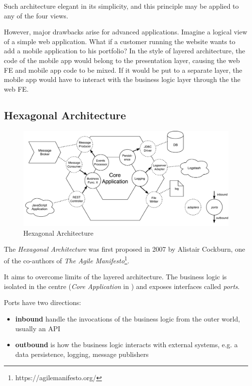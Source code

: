 \documentclass[thesis=M,english,hidelinks]{FITthesis}[2012/10/20]
\begin{document}
Such architecture elegant in its simplicity, and this principle may be applied to any of the four views.

However, major drawbacks arise for advanced applications. Imagine a logical view of a simple web application. What if a customer running the website wants to add a mobile application to his portfolio? In the style of layered architecture, the code of the mobile app would belong to the presentation layer, causing the web \acrshort{FE} and mobile app code to be mixed. If it would be put to a separate layer, the mobile app would have to interact with the business logic layer through the the web \acrshort{FE}.

\subsection{Hexagonal Architecture}
\label{sec:hexagonal_arch}
\begin{figure}[b]
  \centering
    \includegraphics[width=\textwidth]{images/hexagonal_arch.pdf}
    \caption{Hexagonal Architecture}
    \label{fig:hexagonal_arch}
\end{figure}

The \textit{Hexagonal Architecture} was first proposed in 2007 by Alistair Cockburn, one of the co-authors of \textit{The Agile Manifesto}\footnote{https://agilemanifesto.org/}.

It aims to overcome limits of the layered architecture. The business logic is isolated in the centre (\textit{Core Application} in ) and exposes interfaces called \textit{ports}.

Ports have two directions:
\begin{itemize}
    \item \textbf{inbound} handle the invocations of the business logic from the outer world, usually an \acrlong{API}
    \item \textbf{outbound} is how the business logic interacts with external systems, e.g. a data persistence, logging, message publishers
\end{itemize}
\end{document}
